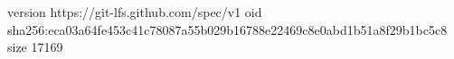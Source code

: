 version https://git-lfs.github.com/spec/v1
oid sha256:eca03a64fe453c41c78087a55b029b16788e22469c8e0abd1b51a8f29b1bc5c8
size 17169
